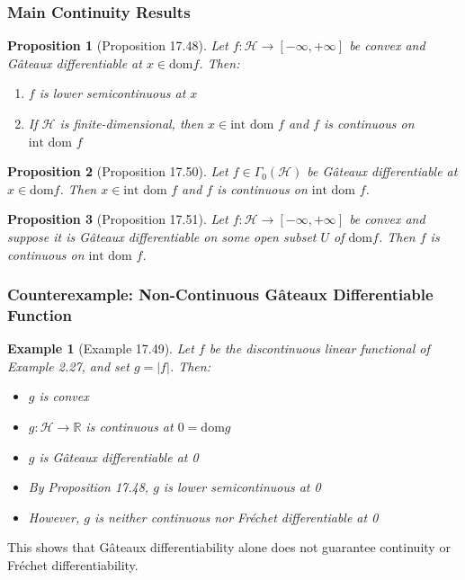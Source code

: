 \documentclass[aspectratio=169,10pt]{beamer}
\newtheorem{prop}{Proposition}
\newtheorem{exmpl}{Example}
\begin{document}
\begin{frame}
  \frametitle{Main Continuity Results}

  \begin{prop}[Proposition 17.48]
    Let $f: \mathcal{H} \to [-\infty, +\infty]$ be convex and Gâteaux differentiable at $x \in \text{dom} f$. Then:
    \begin{enumerate}
      \item[(i)] $f$ is lower semicontinuous at $x$
      \item[(ii)] If $\mathcal{H}$ is finite-dimensional, then $x \in \text{int dom } f$ and $f$ is continuous on $\text{int dom } f$
    \end{enumerate}
  \end{prop}

  \begin{prop}[Proposition 17.50]
    Let $f \in \Gamma_0(\mathcal{H})$ be Gâteaux differentiable at $x \in \text{dom} f$. Then $x \in \text{int dom } f$ and $f$ is continuous on $\text{int dom } f$.
  \end{prop}

  \begin{prop}[Proposition 17.51]
    Let $f: \mathcal{H} \to [-\infty, +\infty]$ be convex and suppose it is Gâteaux differentiable on some open subset $U$ of $\text{dom} f$. Then $f$ is continuous on $\text{int dom } f$.
  \end{prop}
\end{frame}

\begin{frame}
  \frametitle{Counterexample: Non-Continuous Gâteaux Differentiable Function}

  \begin{exmpl}[Example 17.49]
    Let $f$ be the discontinuous linear functional of Example 2.27, and set $g = |f|$. Then:
    \begin{itemize}
      \item $g$ is convex
      \item $g: \mathcal{H} \to \mathbb{R}$ is continuous at $0 = \text{dom} g$
      \item $g$ is Gâteaux differentiable at 0
      \item By Proposition 17.48, $g$ is lower semicontinuous at 0
      \item However, $g$ is neither continuous nor Fréchet differentiable at 0
    \end{itemize}
  \end{exmpl}

  This shows that Gâteaux differentiability alone does not guarantee continuity or Fréchet differentiability.
\end{frame}
\end{document}
